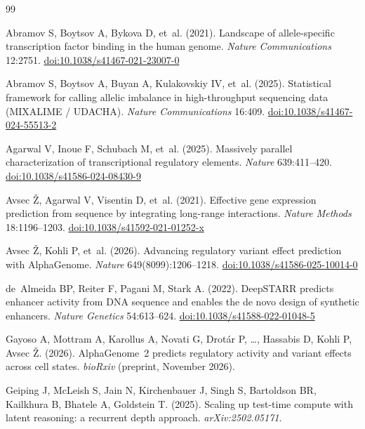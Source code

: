 \documentclass[10.5pt,a4paper]{article}
\begin{document}
\begin{thebibliography}{99}
\setlength{\itemsep}{2pt}

 Abramov S, Boytsov A, Bykova D, et~al. (2021). Landscape of allele-specific transcription factor binding in the human genome. \textit{Nature Communications} 12:2751. \href{https://doi.org/10.1038/s41467-021-23007-0}{doi:10.1038/s41467-021-23007-0}

 Abramov S, Boytsov A, Buyan A, Kulakovskiy IV, et~al. (2025). Statistical framework for calling allelic imbalance in high-throughput sequencing data (MIXALIME / UDACHA). \textit{Nature Communications} 16:409. \href{https://doi.org/10.1038/s41467-024-55513-2}{doi:10.1038/s41467-024-55513-2}

 Agarwal V, Inoue F, Schubach M, et~al. (2025). Massively parallel characterization of transcriptional regulatory elements. \textit{Nature} 639:411--420. \href{https://doi.org/10.1038/s41586-024-08430-9}{doi:10.1038/s41586-024-08430-9}

 Avsec \v{Z}, Agarwal V, Visentin D, et~al. (2021). Effective gene expression prediction from sequence by integrating long-range interactions. \textit{Nature Methods} 18:1196--1203. \href{https://doi.org/10.1038/s41592-021-01252-x}{doi:10.1038/s41592-021-01252-x}

 Avsec \v{Z}, Kohli P, et~al. (2026). Advancing regulatory variant effect prediction with AlphaGenome. \textit{Nature} 649(8099):1206--1218. \href{https://doi.org/10.1038/s41586-025-10014-0}{doi:10.1038/s41586-025-10014-0}

 de~Almeida BP, Reiter F, Pagani M, Stark A. (2022). DeepSTARR predicts enhancer activity from DNA sequence and enables the de novo design of synthetic enhancers. \textit{Nature Genetics} 54:613--624. \href{https://doi.org/10.1038/s41588-022-01048-5}{doi:10.1038/s41588-022-01048-5}

 Gayoso A, Mottram A, Karollus A, Novati G, Drot\'ar P, \ldots, Hassabis D, Kohli P, Avsec \v{Z}. (2026). AlphaGenome~2 predicts regulatory activity and variant effects across cell states. \textit{bioRxiv} (preprint, November 2026).

 Geiping J, McLeish S, Jain N, Kirchenbauer J, Singh S, Bartoldson BR, Kailkhura B, Bhatele A, Goldstein T. (2025). Scaling up test-time compute with latent reasoning: a recurrent depth approach. \textit{arXiv:2502.05171}.


\end{thebibliography}
\end{document}

